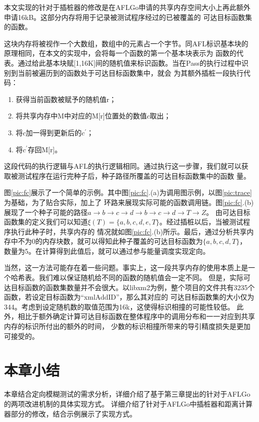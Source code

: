 \documentclass[bachelor]{njupthesis}
\begin{document}
本文实现的针对于插桩器的修改是在AFLGo申请的共享内存空间大小上再此额外申请16kB。这部分内存将用于记录被测试程序经过的已被覆盖的
可达目标函数集的函数。

这块内存将被视作一个大数组，数组中的元素占一个字节。同AFL标识基本块的原理相同，在本文的实现中，会将每一个函数的第一个基本块表示为
函数的代表。通过给此基本块赋[1,16K]间的随机值来标识函数。当在Pass的执行过程中识别到当前被遍历到的函数处于可达目标函数集中，就会
为其额外插桩一段执行代码：

\begin{enumerate}[label=(\arabic*),leftmargin=48pt]
	\item 获得当前函数被赋予的随机值r；
	\item 将共享内存中M中对应的M[r]位置处的数值$c$取出；
	\item 将$c$加一得到更新后的$c^\prime$；
	\item 将$c^\prime$存回M[r]。
\end{enumerate}

这段代码的执行逻辑与AFL的执行逻辑相同。通过执行这一步骤，我们就可以获取被测试程序在运行完种子后，种子路径所覆盖的可达目标函数集中的函数
量。

图\ref{pic:fc}展示了一个简单的示例。其中图\ref{pic:fc}.(a)为调用图示例，以图\ref{pic:trace}为基础，为了贴合实际，加上了
环路来展现实际可能的函数调用链。图\ref{pic:fc}.(b)展现了一个种子可能的路径$a\to b \to c \to d \to b \to c \to d \to T \to Z$。
由可达目标函数集的定义我们可以知道$\xi(T)=\{a,b,c,d,e,T\}$。经过插桩以后，当被测试程序执行此种子时，共享内存的
情况就如图\ref{pic:fc}.(b)所示。最后，通过分析共享内存中不为0的内存块数，就可以得知此种子覆盖的可达目标函数为$\{a,b,c,d,T\}$，
数量为5。在计算得到此值后，就可以通过参与能量调度实现定向。

当然，这一方法可能存在着一些问题。事实上，这一段共享内存的使用本质上是一个哈希表。我们难以保证随机给不同的函数的随机值会一定不同。
但是，实际可达目标函数的函数集数量并不会很大。以libxm2为例，整个项目的文件共有3235个函数，若设定目标函数为“xmlAddID”，那么其对应的
可达目标函数集的大小仅为344。考虑到设定随机数的取值范围为16k，这使得标识相撞的可能性较低。
此外，相比于额外确定计算可达目标函数在整体程序中的调用分布和一一对应到共享内存的标识所付出的额外的时间，
少数的标识相撞所带来的导引精度损失是更加可接受的。

\section{本章小结}
本章结合定向模糊测试的需求分析，详细介绍了基于第三章提出的针对于AFLGo的两项改进机制的具体实现方式。
详细介绍了针对于AFLGo中插桩器和距离计算器部分的修改，结合示例展示了实现方式。
\end{document}
